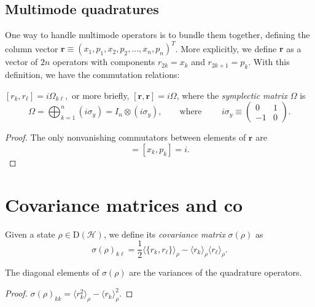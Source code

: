\documentclass[12pt]{report}
\newcommand{\bs}[1]{\boldsymbol{#1}}
\newcommand{\calH}{{\mathcal{H}}}
\newcommand{\rmD}{{\mathrm{D}}}
\begin{document}
\subsection{Multimode quadratures}

One way to handle multimode operators is to bundle them together, defining the column vector
$\bs r \equiv (x_1, p_1, x_2, p_2, ..., x_n, p_n)^T$.
More explicitly, we define $\bs r$ as a vector of $2n$ operators with components $r_{2k}=x_k$ and $r_{2k+1}=p_k$.
With this definition, we have the commutation relations:
\begin{prop}
	$[r_k, r_\ell] = i\Omega_{k\ell},$
	or more briefly, $[\bs r,\bs r] = i\Omega$,
	where the \emph{symplectic matrix} $\Omega$ is
	\begin{equation}
		\Omega = \bigoplus_{k=1}^{n} (i\sigma_y)
		= I_n \otimes (i\sigma_y),
		\qquad
		\text{where }
		\qquad
		i\sigma_y\equiv \begin{pmatrix}
			0 & 1\\-1& 0
		\end{pmatrix}.
	\end{equation}
\end{prop}
\begin{proof}
	The only nonvanishing commutators between elements of $\bs r$ are
	\begin{equation}
		[r_{2k}, r_{2k+1}] = [x_k, p_k] = i.
	\end{equation}
\end{proof}


\section{Covariance matrices and co}

\begin{defn}
	Given a state $\rho\in\rmD(\calH)$,
	we define its \emph{covariance matrix} $\sigma(\rho)$ as
	\begin{equation}
		\sigma(\rho)_{k\ell}
		= \frac12 \langle \{ r_k, r_\ell\}\rangle_\rho
		- \langle r_k\rangle_\rho \langle r_\ell\rangle_\rho.
	\end{equation}
\end{defn}

\begin{prop}
	The diagonal elements of $\sigma(\rho)$ are the variances of the quadrature operators.
\end{prop}
\begin{proof}
	$\sigma(\rho)_{kk} = \langle r_k^2\rangle_\rho - \langle r_k\rangle_\rho^2.$
\end{proof}
\end{document}
